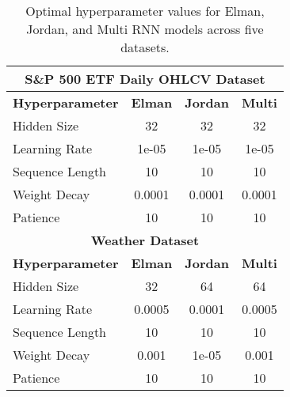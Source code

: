 \begin{table}[H]
{\begin{tabular}{|l|c|c|c|}
        \multicolumn{4}{|c|}{\textbf{S\&P 500 ETF Daily OHLCV Dataset}} \\ \hline
        \textbf{Hyperparameter} & \textbf{Elman} & \textbf{Jordan} & \textbf{Multi} \\ 
        \hline 
        Hidden Size & 32 & 32 & 32 \\ 
        \hline
        Learning Rate & 1e-05 & 1e-05 & 1e-05 \\ 
        \hline
        Sequence Length & 10 & 10 & 10 \\ 
        \hline
        Weight Decay & 0.0001 & 0.0001 & 0.0001 \\ 
        \hline
        Patience & 10 & 10 & 10 \\ 
        \hline 
        
        \multicolumn{4}{|c|}{\textbf{Weather Dataset}} \\ \hline
        \textbf{Hyperparameter} & \textbf{Elman} & \textbf{Jordan} & \textbf{Multi} \\ 
        \hline 
        Hidden Size & 32 & 64 & 64 \\ 
        \hline
        Learning Rate & 0.0005 & 0.0001 & 0.0005 \\ 
        \hline
        Sequence Length & 10 & 10 & 10 \\ 
        \hline
        Weight Decay & 0.001 & 1e-05 & 0.001 \\ 
        \hline
        Patience & 10 & 10 & 10 \\ 
        \hline 
    \end{tabular}
    }
    \vspace{12pt}
    \caption{Optimal hyperparameter values for Elman, Jordan, and Multi RNN models across five datasets.} 
    \label{hyperparameters}
\end{table}
